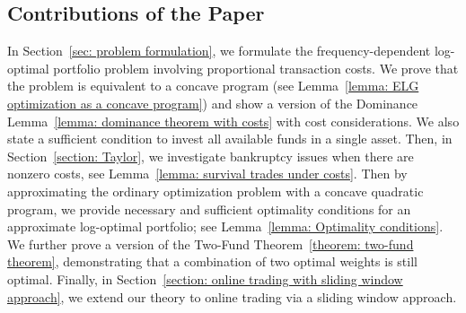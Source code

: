 \documentclass[10pt]{article} %
\begin{document}
	\subsection{Contributions of the Paper}
	In Section~\ref{sec: problem formulation}, we formulate the frequency-dependent log-optimal portfolio problem involving proportional transaction costs. 
	We prove that the problem is equivalent to a concave program (see Lemma~\ref{lemma: ELG optimization as a concave program}) and show a version of the Dominance Lemma~\ref{lemma: dominance theorem with costs} with cost considerations. 
	We also state a sufficient condition to invest all available funds in a single asset.
	Then, in Section~\ref{section: Taylor}, we investigate bankruptcy issues when there are nonzero costs, see Lemma~\ref{lemma: survival trades under costs}. 
	Then by approximating the ordinary optimization problem with a concave quadratic program, we provide necessary and sufficient optimality conditions for an approximate log-optimal portfolio; see Lemma~\ref{lemma: Optimality conditions}. 
	We further prove a version of the Two-Fund Theorem~\ref{theorem: two-fund theorem}, demonstrating that a combination of two optimal weights is still optimal.
	Finally, in Section~\ref{section: online trading with sliding window approach}, we extend our theory to online trading via a sliding window approach.
	
	
	
	
\end{document}
